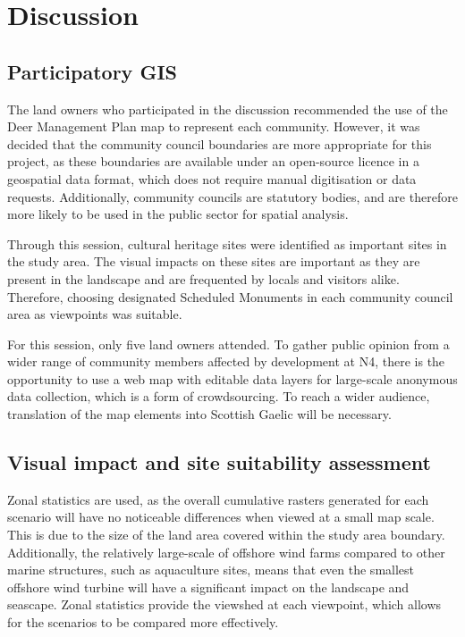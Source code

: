 \chapter{Discussion}

\section{Participatory GIS}

The land owners who participated in the discussion recommended the use of the Deer Management Plan map to represent each community. However, it was decided that the community council boundaries are more appropriate for this project, as these boundaries are available under an open-source licence in a geospatial data format, which does not require manual digitisation or data requests. Additionally, community councils are statutory bodies, and are therefore more likely to be used in the public sector for spatial analysis.

Through this session, cultural heritage sites were identified as important sites in the study area. The visual impacts on these sites are important as they are present in the landscape and are frequented by locals and visitors alike. Therefore, choosing designated Scheduled Monuments in each community council area as viewpoints was suitable.

For this session, only five land owners attended. To gather public opinion from a wider range of community members affected by development at N4, there is the opportunity to use a web map with editable data layers for large-scale anonymous data collection, which is a form of crowdsourcing. To reach a wider audience, translation of the map elements into Scottish Gaelic will be necessary.

\section{Visual impact and site suitability assessment}

Zonal statistics are used, as the overall cumulative rasters generated for each scenario will have no noticeable differences when viewed at a small map scale. This is due to the size of the land area covered within the study area boundary. Additionally, the relatively large-scale of offshore wind farms compared to other marine structures, such as aquaculture sites, means that even the smallest offshore wind turbine will have a significant impact on the landscape and seascape. Zonal statistics provide the viewshed at each viewpoint, which allows for the scenarios to be compared more effectively.

